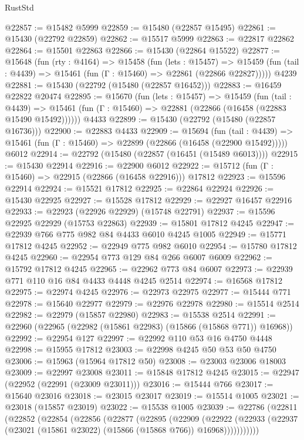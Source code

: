 \begin{lexlean}{RustStd}
\begin{coremodule}
@22857 := @15482 @5999
@22859 := @15480 (@22857 @15495)
@22861 := @15430 (@22792 @22859)
@22862 := @15517 @5999
@22863 := @22817 @22862
@22864 := @15501 @22863
@22866 := @15430 (@22864 @15522)
@22877 := @15648
    (fun (rty : @4164) =>
    @15458
      (fun (lets : @15457) =>
      @15459 (fun (tail : @4439) => @15461 (fun (Γ : @15460) => @22861 (@22866 @22827)))))
    @4239
@22881 := @15430 (@22792 (@15480 (@22857 @16452)))
@22883 := @16459 @22822 @20474
@22895 := @15670
    (fun (lets : @15457) =>
    @15459
      (fun (tail : @4439) =>
      @15461 (fun (Γ : @15460) => @22881 (@22866 (@16458 (@22883 @15490 @15492))))))
    @4433
@22899 := @15430 (@22792 (@15480 (@22857 @16736)))
@22900 := @22883 @4433
@22909 := @15694
    (fun (tail : @4439) => @15461 (fun (Γ : @15460) => @22899 (@22866 (@16458 (@22900 @15492)))))
    @6012
@22914 := @22792 (@15480 (@22857 (@16451 (@15489 @6013))))
@22915 := @15430 @22914
@22916 := @22900 @6012
@22922 := @15712 (fun (Γ : @15460) => @22915 (@22866 (@16458 @22916))) @17812
@22923 := @15596 @22914
@22924 := @15521 @17812
@22925 := @22864 @22924
@22926 := @15430 @22925
@22927 := @15528 @17812
@22929 := @22927 @16457 @22916
@22933 := @22923 (@22926 @22929) (@15748 @22791)
@22937 := @15596 @22925 @22929 (@15753 @22863)
@22939 := @15801 @17812 @4245
@22947 := @22939 @766 @775 @982 @84 @4433 @6010 @4245 @1005
@22949 := @15771 @17812 @4245
@22952 := @22949 @775 @982 @6010
@22954 := @15780 @17812 @4245
@22960 := @22954 @773 @129 @84 @266 @6007 @6009
@22962 := @15792 @17812 @4245
@22965 := @22962 @773 @84 @6007
@22973 := @22939 @771 @110 @16 @84 @4433 @4448 @4245 @2514
@22974 := @16568 @17812
@22975 := @22974 @4245
@22976 := @22973 @22975
@22977 := @15444 @771
@22978 := @15640 @22977
@22979 := @22976 @22978
@22980 := @15514 @2514
@22982 := @22979 (@15857 @22980)
@22983 := @15538 @2514
@22991 := @22960 (@22965 (@22982 (@15861 @22983) (@15866 (@15868 @771)) @16968))
@22992 := @22954 @127
@22997 := @22992 @110 @53 @16 @4750 @4448
@22998 := @15955 @17812
@23003 := @22998 @4245 @50 @53 @50 @4750
@23006 := @15963 (@15964 @17812 @50)
@23008 := @23003 @23006 @18003
@23009 := @22997 @23008
@23011 := @15848 @17812 @4245
@23015 := @22947 (@22952 (@22991 (@23009 @23011)))
@23016 := @15444 @766
@23017 := @15640 @23016
@23018 := @23015 @23017
@23019 := @15514 @1005
@23021 := @23018 (@15857 @23019)
@23022 := @15538 @1005
@23039 := @22786
    (@22811
      (@22852
        (@22854
          (@22856
            (@22877
              (@22895
                (@22909
                  (@22922
                    (@22933 (@22937 (@23021 (@15861 @23022) (@15866 (@15868 @766)) @16968)))))))))))

\end{coremodule}
\end{lexlean}
